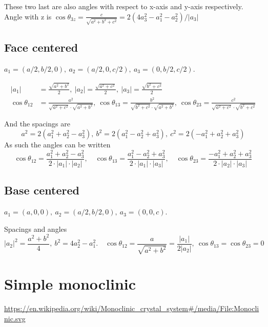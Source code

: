 \documentclass[a4paper,10pt]{article} 	%
\numberwithin{equation}{section}
\begin{document}
	These two last are also angles with respect to x-axis and y-axis respectively. Angle with z is $\cos\theta_{3z} = \frac{c}{\sqrt{a^2+b^2+c^2}} = 2(4a_3^2-a_1^2-a_2^2)/|a_3|$
	
	\subsection{Face centered}
	$ a_1 = (a/2,b/2,0), \ a_2 = (a/2,0,c/2), \ a_3 = (0,b/2,c/2) $.
	
	\begin{align} 
	|a_1| &= \frac{\sqrt{a^2+b^2}}{2}, \ |a_2| = \frac{\sqrt{a^2+c^2}}{2}, \ |a_3| = \frac{\sqrt{b^2+c^2}}{2} \\
	\cos \theta_{12} &= \frac{a^2}{\sqrt{a^2+c^2} \cdot \sqrt{a^2+b^2}},\ \cos \theta_{13} = \frac{b^2}{\sqrt{b^2+c^2} \cdot \sqrt{a^2+b^2}},\ \cos \theta_{23} = \frac{c^2}{\sqrt{a^2+c^2} \cdot \sqrt{b^2+c^2}} 
	\end{align}
	
	And the spacings are
	\begin{equation}\label{key}
		a^2 = 2 (a_1^2+a_2^2-a_3^2), \ b^2 = 2(a_1^2-a_2^2+a_3^2), \ c^2 = 2(-a_1^2+a_2^2+a_3^2)
	\end{equation}
	As such the angles can be written
	\begin{equation}\label{key}
		\cos \theta_{12} = \frac{a_1^2+a_2^2-a_3^2}{2 \cdot |a_1| \cdot |a_2|}, \quad
		\cos \theta_{13} = \frac{a_1^2-a_2^2+a_3^2}{2 \cdot |a_1| \cdot |a_3|}, \quad
		\cos \theta_{23} = \frac{-a_1^2+a_2^2+a_3^2}{2 \cdot |a_2| \cdot |a_3|}
	\end{equation}
	
	
	\subsection{Base centered}
	$ a_1 = (a,0,0),\ a_2 = (a/2,b/2,0),\ a_3 = (0,0,c) $.
	
	Spacings and angles
	\begin{equation}\label{key}
	|a_2|^2 = \frac{a^2+b^2}{4}, \ b^2 = 4a_2^2-a_1^2. \quad \cos \theta_{12} = \frac{a}{\sqrt{a^2+b^2}} = \frac{|a_1|}{2|a_2|}, \ \cos\theta_{13} = \cos \theta_{23} = 0
	\end{equation}
	
	\section{Simple monoclinic}
	\url{https://en.wikipedia.org/wiki/Monoclinic_crystal_system#/media/File:Monoclinic.svg}
\end{document}
